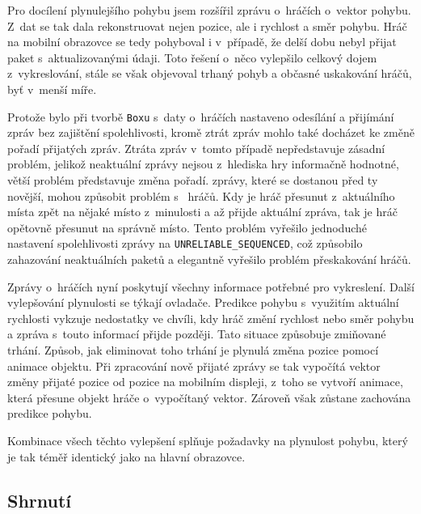 \documentclass[thesis=B,czech,hidelinks]{FITthesis}[2012/06/26] %
\newcommand{\code}[1]{\texttt{#1}}
\begin{document}

Pro docílení plynulejšího pohybu jsem rozšířil zprávu o~hráčích o~vektor pohybu. Z~dat se tak dala rekonstruovat nejen pozice, ale i rychlost a směr pohybu. Hráč na mobilní obrazovce se tedy pohyboval i v~případě, že delší dobu nebyl přijat paket s~aktualizovanými údaji. Toto řešení o~něco vylepšilo celkový dojem z~vykreslování, stále se však objevoval trhaný pohyb a občasné uskakování hráčů, byť v~menší míře.


Protože bylo při tvorbě \code{Boxu} s~daty o~hráčích nastaveno odesílání a přijímání zpráv bez zajištění spolehlivosti, kromě ztrát zpráv mohlo také docházet ke změně pořadí přijatých zpráv. Ztráta zpráv v~tomto případě nepředstavuje zásadní problém, jelikož neaktuální zprávy nejsou z~hlediska hry informačně hodnotné, větší problém představuje změna pořadí.  zprávy, které se dostanou před ty novější, mohou způsobit problém s~ hráčů. Kdy je hráč přesunut z~aktuálního místa zpět na nějaké místo z~minulosti a až přijde aktuální zpráva, tak je hráč opětovně přesunut na správně místo. Tento problém vyřešilo jednoduché nastavení spolehlivosti zprávy na \code{UNRELIABLE\_SEQUENCED}, což způsobilo zahazování neaktuálních paketů a elegantně vyřešilo problém přeskakování hráčů.

Zprávy o~hráčích nyní poskytují všechny informace potřebné pro vykreslení. Další vylepšování plynulosti se týkají ovladače. Predikce pohybu s~využitím aktuální rychlosti vykzuje nedostatky ve chvíli, kdy hráč změní rychlost nebo směr pohybu a zpráva s~touto informací přijde později. Tato situace způsobuje zmiňované trhání. Způsob, jak eliminovat toho trhání je plynulá změna pozice pomocí animace objektu. Při zpracování nově přijaté zprávy se tak vypočítá vektor změny přijaté pozice od pozice na mobilním displeji, z~toho se vytvoří animace, která přesune objekt hráče o~vypočítaný vektor. Zároveň však zůstane zachována predikce pohybu. 


Kombinace všech těchto vylepšení splňuje požadavky na plynulost pohybu, který je tak téměř identický jako na hlavní obrazovce.

\subsection{Shrnutí}
\end{document}
